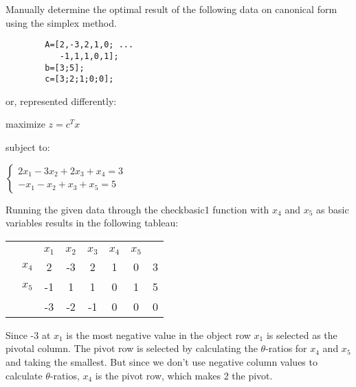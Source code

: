 \documentclass{article}
\begin{document}
    Manually determine the optimal result of the following data on canonical
    form using the simplex method.

    \begin{lstlisting}
        A=[2,-3,2,1,0; ...
           -1,1,1,0,1];
        b=[3;5];
        c=[3;2;1;0;0];
    \end{lstlisting}

    or, represented differently:

    \begin{center}
        maximize $ z = c^Tx $
    \end{center}

    subject to:

    \begin{center}
        \begin{math}
            \begin{cases}
                2x_1 - 3x_2 + 2x_3 + x_4 = 3\\
                -x_1 - x_2 + x_3 + x_5 = 5
            \end{cases}
        \end{math}
    \end{center}

    Running the given data through the checkbasic1 function with $x_4$ and
    $x_5$ as basic variables results in the following tableau:

    \begin{center}
        \begin{tabular}{ c | c | c c c c c | c | }
            \multicolumn{1}{c}{}  & \multicolumn{1}{c}{}  &       &       &       & \multicolumn{1}{c}{}\\
            \cline{2-8}
            &  & $x_1$ & $x_2$ & $x_3$ & $x_4$ & $x_5$ &\\
            \cline{2-8}
                          &  $x_4$ &2 &-3 &2 &1 &0 &3\\
                          &  $x_5$ &-1 &1 &1 &0 &1 &5\\
            \cline{2-8}
                          &        &-3 &-2 &-1 &0 &0 &0\\
            \cline{2-8}
        \end{tabular}
    \end{center}

    Since -3 at $x_1$ is the most negative value in the object row $x_1$ is
    selected as the pivotal column. The pivot row is selected by calculating
    the $\theta$-ratios for $x_4$ and $x_5$ and taking the smallest. But since
    we don't use negative column values to calculate $\theta$-ratios, $x_4$ is
    the pivot row, which makes 2 the pivot.
\end{document}

